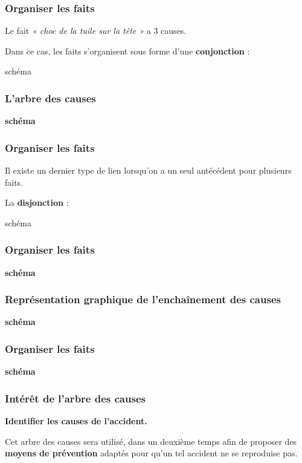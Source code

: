 \documentclass{beamer}
\begin{document}
\begin{frame}
\frametitle{Organiser les faits}

Le fait \textit{« choc de la tuile sur la tête »} a 3 causes.

Dans ce cas, les faits s’organisent sous forme d’une \textbf{conjonction} :

schéma
\end{frame}

\begin{frame}
\frametitle{L’arbre des causes}

\textbf{schéma}
\end{frame}


\begin{frame}
\frametitle{Organiser les faits}

Il existe un dernier type de lien lorsqu’on a un seul antécédent pour plusieurs faits.

La \textbf{disjonction} :

schéma
\end{frame}

\begin{frame}
\frametitle{Organiser les faits}


\textbf{schéma}
\end{frame}

\begin{frame}
\frametitle{Représentation graphique de l'enchaînement des causes}

\textbf{schéma}
\end{frame}

\begin{frame}
\frametitle{Organiser les faits}

\textbf{schéma}
\end{frame}

\begin{frame}
\frametitle{Intérêt de l’arbre des causes}

\textbf{Identifier les causes de l’accident.}

Cet arbre des causes sera utilisé, dans un deuxième temps afin de proposer des \textbf{moyens de prévention} adaptés pour qu’un tel accident ne se reproduise pas.
\end{frame}
\end{document}
